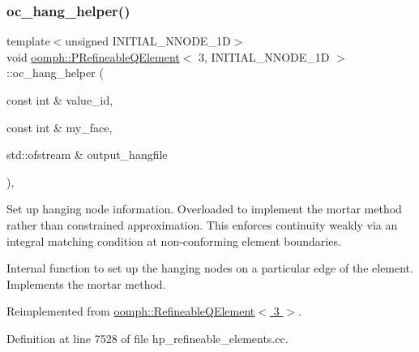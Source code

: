 \mbox{\label{classoomph_1_1PRefineableQElement_3_013_00_01INITIAL__NNODE__1D_01_4_ae291430b43e01a7d20c411ef4ac79e45}} 
\subsubsection{\texorpdfstring{oc\+\_\+hang\+\_\+helper()}{oc\_hang\_helper()}}
{\footnotesize\ttfamily template$<$unsigned I\+N\+I\+T\+I\+A\+L\+\_\+\+N\+N\+O\+D\+E\+\_\+1D$>$ \\
void \hyperlink{classoomph_1_1PRefineableQElement}{oomph\+::\+P\+Refineable\+Q\+Element}$<$ 3, I\+N\+I\+T\+I\+A\+L\+\_\+\+N\+N\+O\+D\+E\+\_\+1D $>$\+::oc\+\_\+hang\+\_\+helper (\begin{DoxyParamCaption}\item[{const int \&}]{value\+\_\+id,  }\item[{const int \&}]{my\+\_\+face,  }\item[{std\+::ofstream \&}]{output\+\_\+hangfile }\end{DoxyParamCaption})\hspace{0.3cm}{\ttfamily [protected]}, {\ttfamily [virtual]}}



Set up hanging node information. Overloaded to implement the mortar method rather than constrained approximation. This enforces continuity weakly via an integral matching condition at non-\/conforming element boundaries. 

Internal function to set up the hanging nodes on a particular edge of the element. Implements the mortar method. 

Reimplemented from \hyperlink{classoomph_1_1RefineableQElement_3_013_01_4_abde04c6b8616bd2551b24ac1abade563}{oomph\+::\+Refineable\+Q\+Element$<$ 3 $>$}.



Definition at line 7528 of file hp\+\_\+refineable\+\_\+elements.\+cc.




